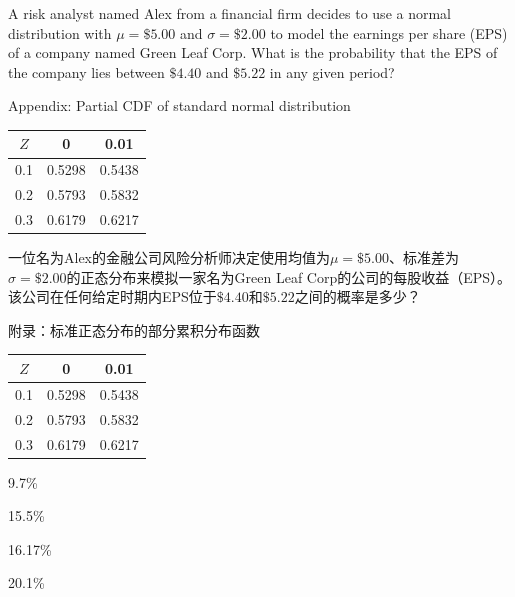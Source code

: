 \documentclass{article}
\newcounter{question} %
\begin{document}
    \begin{question}
        A risk analyst named Alex from a financial firm decides to use a normal distribution with $\mu = \$5.00$ and $\sigma=\$2.00$ to model the earnings per share (EPS) of a company named Green Leaf Corp. What is the probability that the EPS of the company lies between $\$4.40$ and $\$5.22$ in any given period?
        
        \begin{center}
        Appendix: Partial CDF of standard normal distribution\\
        \begin{tabular}{|c|c|c|}
        \hline
        $Z$ & 0 & 0.01 \\
        \hline
        0.1 & 0.5298 & 0.5438 \\
        \hline
        0.2 & 0.5793 & 0.5832 \\
        \hline
        0.3 & 0.6179 & 0.6217 \\
        \hline
        \end{tabular}
        \end{center}
        一位名为Alex的金融公司风险分析师决定使用均值为$\mu = \$5.00$、标准差为$\sigma=\$2.00$的正态分布来模拟一家名为Green Leaf Corp的公司的每股收益（EPS）。该公司在任何给定时期内EPS位于$\$4.40$和$\$5.22$之间的概率是多少？
        
        \begin{center}
        附录：标准正态分布的部分累积分布函数\\
        \begin{tabular}{|c|c|c|}
        \hline
        $Z$ & 0 & 0.01 \\
        \hline
        0.1 & 0.5298 & 0.5438 \\
        \hline
        0.2 & 0.5793 & 0.5832 \\
        \hline
        0.3 & 0.6179 & 0.6217 \\
        \hline
        \end{tabular}
        \end{center}
        \end{question}
        
        \begin{choices}
            \item 9.7\%
            \item 15.5\%
            \item 16.17\%
            \item 20.1\%
        \end{choices}
        
\end{document}
